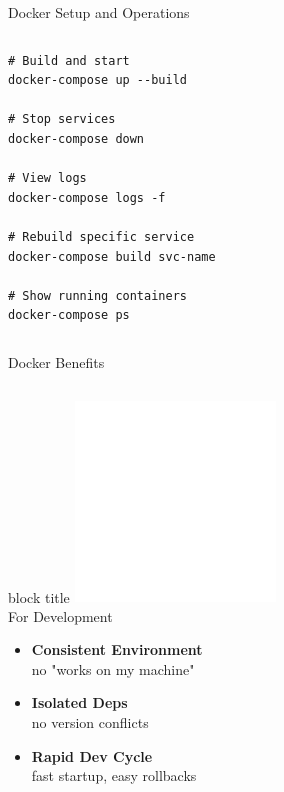 \documentclass[notes]{beamer}
\begin{document}
{\begin{frame}[fragile]{Docker Setup and Operations}
\begin{columns}[T]
\begin{column}{0.48\textwidth}
        \begin{verbatim}
# Build and start
docker-compose up --build

# Stop services
docker-compose down

# View logs
docker-compose logs -f

# Rebuild specific service
docker-compose build svc-name

# Show running containers
docker-compose ps
        \end{verbatim}
    \end{column}
  \end{columns}
\end{frame}

\begin{frame}{Docker Benefits}
  \begin{columns}[T]
    \begin{column}{0.32\textwidth}
        \begin{beamercolorbox}[shadow=true,rounded=true]{block title}
        \centering 
        \includegraphics[width=0.4\textwidth]{coding.png}\\[0.3em]
        For Development
      \end{beamercolorbox}
      \begin{itemize}
        \item \textbf{Consistent Environment} \\[-0.4em]
        {\tiny no "works on my machine"}
        \item \textbf{Isolated Deps} \\[-0.4em]
        {\tiny no version conflicts}
        \item \textbf{Rapid Dev Cycle} \\[-0.4em]
        {\tiny fast startup, easy rollbacks}
      \end{itemize}
    \end{column}
    
    \hspace{0.2em}
    

\end{columns}
\end{frame}}
\end{document}
